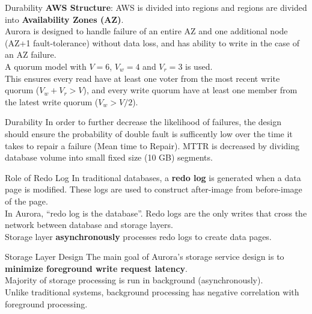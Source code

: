     \begin{frame}{Durability}
      \LARGE
      \textbf{AWS Structure}: AWS is divided into regions and regions are divided into \textbf{Availability Zones (AZ)}.\\ %
      \pause
      Aurora is designed to handle failure of an entire AZ and one additional node (AZ+1 fault-tolerance) without data loss, and has ability to write in the case of an AZ failure.\\
      \pause
      A quorum model with $V=6$, $V_w=4$ and $V_r=3$ is used.\\
      \pause
      This ensures every read have at least one voter from the most recent write quorum ($V_w + V_r > V$), and every write quorum have at least one member from the latest write quorum ($V_w > V / 2$).\\
    \end{frame}

    \begin{frame}{Durability}
      \LARGE
      In order to further decrease the likelihood of failures, the design should ensure the probability of double fault is sufficently low over the time it takes to repair a failure (Mean time to Repair). MTTR is decreased by dividing database volume into small fixed size (10 GB) segments.
    \end{frame}

    \begin{frame}{Role of Redo Log}
      \LARGE
      In traditional databases, a \textbf{redo log} is generated when a data page is modified. These logs are used to construct after-image from before-image of the page.\\
      \pause
      In Aurora, ``redo log is the database''. Redo logs are the only writes that cross the network between database and storage layers.\\
      \pause
      Storage layer \textbf{asynchronously} processes redo logs to create data pages.
    \end{frame}

    \begin{frame}{Storage Layer Design}
      \LARGE
      The main goal of Aurora's storage service design is to \textbf{minimize foreground write request latency}.\\
      \pause
      Majority of storage processing is run in background (asynchronously).\\
      \pause
      Unlike traditional systems, background processing has negative correlation with foreground processing.
    \end{frame}

